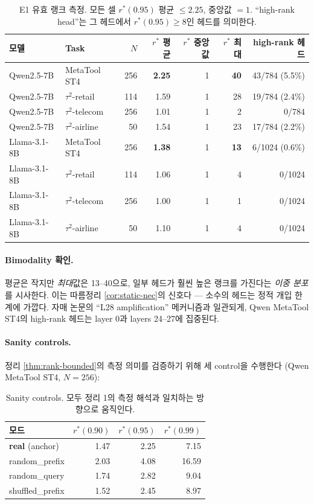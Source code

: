 \documentclass{article}
\theoremstyle{definition}
\begin{document}
\begin{table}[h]
\centering
\caption{E1 유효 랭크 측정. 모든 셀 $r^*(0.95)$ 평균 $\le 2.25$, 중앙값 $= 1$. ``high-rank head''는 그 헤드에서 $r^*(0.95) \ge 8$인 헤드를 의미한다.}
\label{tab:rank-headline}
\small
\begin{tabular}{llrrrrr}
\toprule
모델 & Task & $N$ & $r^*$ 평균 & $r^*$ 중앙값 & $r^*$ 최대 & high-rank 헤드 \\
\midrule
Qwen2.5-7B   & MetaTool ST4    & 256 & \textbf{2.25} & 1 & \textbf{40} & 43/784 (5.5\%) \\
Qwen2.5-7B   & $\tau^2$-retail  & 114 & 1.59 & 1 & 28 & 19/784 (2.4\%) \\
Qwen2.5-7B   & $\tau^2$-telecom & 256 & 1.01 & 1 & 2  & 0/784 \\
Qwen2.5-7B   & $\tau^2$-airline & 50  & 1.54 & 1 & 23 & 17/784 (2.2\%) \\
Llama-3.1-8B & MetaTool ST4    & 256 & \textbf{1.38} & 1 & \textbf{13} & 6/1024 (0.6\%) \\
Llama-3.1-8B & $\tau^2$-retail  & 114 & 1.06 & 1 & 4  & 0/1024 \\
Llama-3.1-8B & $\tau^2$-telecom & 256 & 1.00 & 1 & 1  & 0/1024 \\
Llama-3.1-8B & $\tau^2$-airline & 50  & 1.10 & 1 & 4  & 0/1024 \\
\bottomrule
\end{tabular}
\end{table}

\paragraph{Bimodality 확인.}
평균은 작지만 \emph{최대}값은 13--40으로, 일부 헤드가 훨씬 높은 랭크를 가진다는 \emph{이중 분포}를 시사한다. 이는 따름정리 \ref{cor:static-nec}의 신호다 --- 소수의 헤드는 정적 개입 한계에 가깝다. 자매 논문의 ``L28 amplification'' 메커니즘과 일관되게, Qwen MetaTool ST4의 high-rank 헤드는 layer 0과 layers 24--27에 집중된다.

\paragraph{Sanity controls.}
정리 \ref{thm:rank-bounded}의 측정 의미를 검증하기 위해 세 control을 수행한다 (Qwen MetaTool ST4, $N{=}256$):
\begin{table}[h]
\centering
\caption{Sanity controls. 모두 정리 1의 측정 해석과 일치하는 방향으로 움직인다.}
\label{tab:sanity}
\small
\begin{tabular}{lrrr}
\toprule
모드 & $r^*(0.90)$ & $r^*(0.95)$ & $r^*(0.99)$ \\
\midrule
\textbf{real} (anchor) & 1.47 & 2.25 & 7.15 \\
random\_prefix         & 2.03 & 4.08 & 16.59 \\
random\_query          & 1.74 & 2.82 & 9.04 \\
shuffled\_prefix       & 1.52 & 2.45 & 8.97 \\
\bottomrule
\end{tabular}
\end{table}
\end{document}
